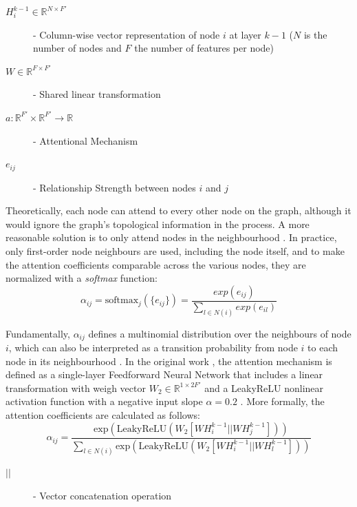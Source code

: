 \begin{description}
	\item[$H^{k - 1}_i \in \mathbb{R}^{N \times F'}$] - Column-wise vector representation of node $i$ at layer $k - 1$ ($N$ is the number of nodes and $F$ the number of features per node) 
	\item[$W \in \mathbb{R}^{F \times F'}$] - Shared linear transformation
	\item[$a: \mathbb{R}^{F'} \times \mathbb{R}^{F'} \rightarrow \mathbb{R}$] - Attentional Mechanism
	\item[$e_{ij}$] - Relationship Strength between nodes $i$ and $j$ 
\end{description}


Theoretically, each node can attend to every other node on the graph, although it would ignore the graph's topological information in the process. A more reasonable solution is to only attend nodes in the neighbourhood \cite{velickovicGraphAttentionNetworks2018, tangGraphNeuralNetworks2022}. In practice, only first-order node neighbours are used, including the node itself, and to make the attention coefficients comparable across the various nodes, they are normalized with a \textit{softmax} function:
$$ \alpha_{ij} = \text{softmax}_j(\{e_{ij}\}) = \frac{exp(e_{ij})}{\sum_{l \in N(i)} exp(e_{il})}$$

Fundamentally, $\alpha_{ij}$ defines a multinomial distribution over the neighbours of node $i$, which can also be interpreted as a transition probability from node $i$ to each node in its neighbourhood \cite{tangGraphNeuralNetworks2022}. 
In the original work \cite{velickovicGraphAttentionNetworks2018}, the attention mechanism is defined as a single-layer Feedforward Neural Network that includes a linear transformation with weigh vector $W_2 \in \mathbb{R}^{1 \times 2 F'}$ and a LeakyReLU nonlinear activation function with a negative input slope $\alpha = 0.2$ \cite{tangGraphNeuralNetworks2022, velickovicGraphAttentionNetworks2018}. More formally, the attention coefficients are calculated as follows:
\begin{equation}
	\alpha_{ij} = \frac{ \text{exp}( \text{LeakyReLU}( W_2 [W H^{k - 1}_i || W H^{k - 1}_j]))}{ \sum_{l \in N(i)} \text{exp}( \text{LeakyReLU}( W_2 [W H^{k - 1}_i || W H^{k - 1}_l])) }
\end{equation}

\begin{description}
	\item[$||$] - Vector concatenation operation
\end{description}

